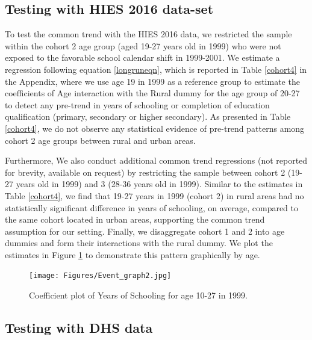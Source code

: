 \documentclass[12pt,letterpaper]{article}\usepackage[margin=1in]{geometry}
\newcommand{\0}{\ensuremath{\mbox{\boldmath $0$}}}
\begin{document}
\subsection{Testing with HIES 2016 data-set\label{subsec.cohort_trend_HIES}}
To test the common trend with the HIES 2016 data, we restricted the sample within the cohort 2 age group (aged 19-27 years old in 1999) who were not exposed to the favorable school calendar shift in 1999-2001. We estimate a regression following equation \ref{longruneqn}, which is reported in Table \ref{cohort4} in the Appendix, where we use age 19 in 1999 as a reference group to estimate the coefficients of Age interaction with the Rural dummy for the age group of 20-27 to detect any pre-trend in years of schooling or completion of education qualification (primary, secondary or higher secondary). As presented in Table \ref{cohort4}, we do not observe any statistical evidence of pre-trend patterns among cohort 2 age groups between rural and urban areas. 

Furthermore, We also conduct additional common trend regressions (not reported for brevity, available on request) by restricting the sample between cohort 2 (19-27 years old in 1999) and 3 (28-36 years old in 1999). Similar to the estimates in Table \ref{cohort4}, we find that 19-27 years in 1999 (cohort 2) in rural areas had no statistically significant difference in years of schooling, on average, compared to the same cohort located in urban areas, supporting the common trend assumption for our setting. Finally, we disaggregate cohort 1 and 2 into age dummies and form their interactions with the rural dummy. We plot the estimates in Figure \ref{event_graph} to demonstrate this pattern graphically by age.  

\begin{figure}[h!]
\centering
\texttt{[image: Figures/Event\_graph2.jpg]}\\
\caption{Coefficient plot of Years of Schooling for age 10-27 in 1999.\protect\footnotemark}
\label{event_graph}
\end{figure}

\subsection{Testing with DHS data\label{subsec.cohort_trend_DHS}}
\end{document}
